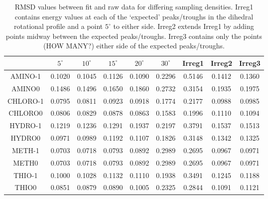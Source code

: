 \documentclass[11pt, oneside]{article}   	%
\begin{document}
\begin{table}[!tb]
\centering
\caption{RMSD values between fit and raw data for differing sampling densities. Irreg1 contains energy values at each of the `expected' peaks/troughs in the dihedral rotational profile and a point $5^{\circ}$ to either side. Irreg2 extends Irreg1 by adding points midway between the expected peaks/troughs. Irreg3 contains only the points (HOW MANY?) either side of the expected peaks/troughs.}
\label{tb:datadensity}
\begin{tabular}{|c|c|c|c|c|c|c|c|c|}
\hline
         & $5^{\circ}$ & $10^{\circ}$ & $15^{\circ}$ & $20^{\circ}$ & $30^{\circ}$ & Irreg1  & Irreg2  & Irreg3  \\ \hline
AMINO-1  & 0.1020 & 0.1045 & 0.1126 & 0.1090 & 0.2296 & 0.5146  & 0.1412  & 0.1360  \\ \hline
AMINO0   & 0.1486 & 0.1496 & 0.1650 & 0.1860 & 0.2732 & 0.3154  & 0.1935  & 0.1975  \\ \hline
CHLORO-1 & 0.0795 & 0.0811 & 0.0923 & 0.0918 & 0.1774 & 0.2177  & 0.0988  & 0.0985  \\ \hline
CHLORO0  & 0.0806 & 0.0829 & 0.0878 & 0.0863 & 0.1583 & 0.1996  & 0.1110  & 0.1094  \\ \hline
HYDRO-1  & 0.1219 & 0.1236 & 0.1291 & 0.1937 & 0.2197 & 0.3791  & 0.1537  & 0.1513  \\ \hline
HYDRO0   & 0.0971 & 0.0989 & 0.1192 & 0.1107 & 0.1826 & 0.3148  & 0.1342  & 0.1325  \\ \hline
METH-1   & 0.0703 & 0.0718 & 0.0793 & 0.0892 & 0.2989 & 0.2695  & 0.0967  & 0.0971  \\ \hline
METH0    & 0.0703 & 0.0718 & 0.0793 & 0.0892 & 0.2989 & 0.2695  & 0.0967  & 0.0971  \\ \hline
THIO-1   & 0.1000 & 0.1028 & 0.1132 & 0.1110 & 0.1938 & 0.3491  & 0.1245  & 0.1188  \\ \hline
THIO0    & 0.0851 & 0.0879 & 0.0890 & 0.1005 & 0.2325 & 0.2844  & 0.1091  & 0.1121  \\ \hline
\end{tabular}
\end{table}
\end{document}
